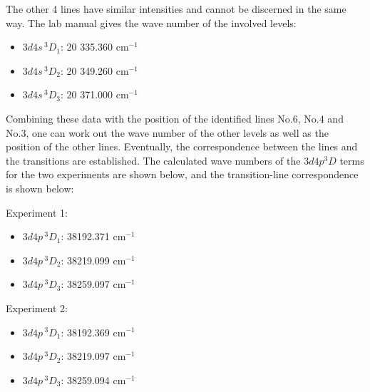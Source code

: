 \documentclass[a4paper]{article}
\begin{document}
The other 4 lines have similar intensities and cannot be discerned in
the same way. The lab manual gives the wave number of the involved
levels:
\begin{itemize}
\item $3d4s\,^3D_1$: 20 335.360 cm$^{-1}$
\item $3d4s\,^3D_2$: 20 349.260 cm$^{-1}$
\item $3d4s\,^3D_3$: 20 371.000 cm$^{-1}$
\end{itemize}
Combining these data with the position of the identified lines No.6,
No.4 and No.3, one can work out the wave number of the other levels as
well as the position of the other lines. Eventually, the correspondence
between the lines and the transitions are established. The calculated wave
numbers of the $3d4p ^3D$ terms for the two experiments are shown below, and the
transition-line correspondence is shown below:

Experiment 1:							
\begin{itemize}
\item $3d4p\,^3D_1$: 38192.371 cm$^{-1}$	
\item $3d4p\,^3D_2$: 38219.099 cm$^{-1}$	
\item $3d4p\,^3D_3$: 38259.097 cm$^{-1}$	
\end{itemize}

Experiment 2:
\begin{itemize}							
\item $3d4p\,^3D_1$: 38192.369 cm$^{-1}$	
\item $3d4p\,^3D_2$: 38219.097 cm$^{-1}$	
\item $3d4p\,^3D_3$: 38259.094 cm$^{-1}$	
\end{itemize}
\end{document}
